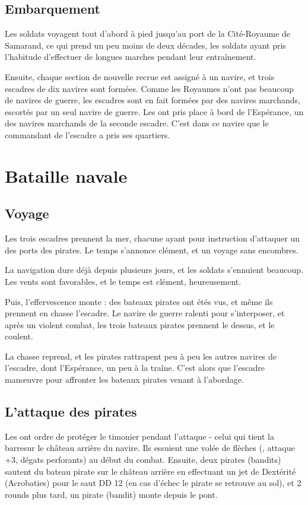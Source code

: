 \documentclass[a4paper,10pt,openany]{book}
\begin{document}
\begin{multicols}{2}
\subsection{Embarquement}
Les soldats voyagent tout d’abord à pied jusqu’au port de la Cité-Royaume de Samarand, ce qui prend un peu moins de deux décades, les soldats ayant
pris l’habitude d’effectuer de longues marches pendant leur entraînement.\par Ensuite, chaque section de nouvelle recrue est assigné à un navire, et
trois escadres de dix navires sont formées. Comme les Royaumes n’ont pas beaucoup de navires de guerre, les escadres sont en fait formées par des
navires marchands, escortés par un seul navire de guerre. Les \PJs ont pris place à bord de l’Espérance, un des navires marchands de la seconde
escadre. C’est dans ce navire que le commandant de l’escadre a pris ses quartiers.
\section{Bataille navale}
\subsection{Voyage}
Les trois escadres prennent la mer, chacune ayant pour instruction d’attaquer un des ports des pirates. Le temps s’annonce clément, et un voyage sans
encombres.\par La navigation dure déjà depuis plusieurs jours, et les soldats s’ennuient beaucoup. Les vents sont favorables, et le temps est clément,
heureusement.\par Puis, l’effervescence monte : des bateaux pirates ont étés vus, et même ils prennent en chasse l’escadre. Le navire de guerre
ralenti pour s’interposer, et après un violent combat, les trois bateaux pirates prennent le dessus, et le coulent.\par La chasse reprend, et les
pirates rattrapent peu à peu les autres navires de l’escadre, dont l’Espérance, un peu à la traîne. C’est alors que l’escadre manœuvre pour affronter
les bateaux pirates venant à l’abordage.\par
\subsection{L’attaque des pirates}
Les \PJs ont ordre de protéger le timonier pendant l’attaque - celui qui tient la barresur le château arrière du navire. Ils essuient une volée de
flèches (, attaque +3,  dégats perforants) au début du combat. Ensuite, deux pirates (bandits) sautent du bateau pirate sur le
château arrière en effectuant un jet de Dextérité (Acrobaties) pour le saut DD 12 (en cas d’échec le pirate se retrouve au sol), et 2 rounds plus
tard, un pirate (bandit) monte depuis le pont.\par


\end{multicols}
\end{document}
